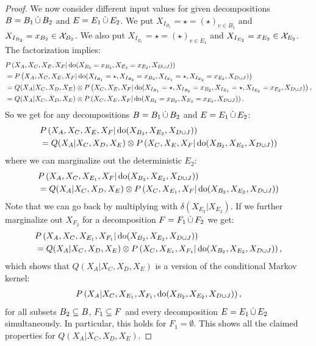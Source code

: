 \begin{proof}
We now consider different input values for given decompositions $B=B_1 \,\dot{\cup}\, B_2$ and $E=E_1 \,\dot{\cup}\, E_2$.
We put $X_{I_{B_1}}= \star = (\star)_{v \in B_1}$ and  $ X_{I_{B_2}}=x_{B_2} \in \mathcal{X}_{B_2}$.
We also put $X_{I_{E_1}}= \star = (\star)_{v \in E_1}$ and $X_{I_{E_2}}=x_{E_2} \in \mathcal{X}_{E_2}$.
The factorization  implies:
\begin{align*} 
  & P\left ( X_A,X_C,X_E,X_F|\operatorname{do}(X_{{B_2}}=x_{B_2},X_{E_2}=x_{E_2},X_{D\cup J})\right ) \\
  &= P\left ( X_A,X_C,X_E,X_F|\operatorname{do}(X_{I_{B_1}}=\star,X_{I_{B_2}}=x_{B_2},X_{I_{E_1}}=\star,X_{I_{E_2}}=x_{E_2},X_{D\cup J})\right ) \\
  &= Q(X_A|X_C,X_D,X_E) \otimes P\left ( X_C,X_E,X_F|\operatorname{do}(X_{I_{B_1}}=\star,X_{I_{B_2}}=x_{B_2},X_{I_{E_1}}=\star,X_{I_{E_2}}=x_{E_2},X_{D\cup J})\right ),\\
  &= Q(X_A|X_C,X_D,X_E) \otimes P\left ( X_C,X_E,X_F|\operatorname{do}(X_{{B_2}}=x_{B_2},X_{{E_2}}=x_{E_2},X_{D\cup J})\right ).
\end{align*}
So we get for any decompositions $B=B_1 \,\dot{\cup}\, B_2$ and $E=E_1 \,\dot{\cup}\, E_2$:
\begin{equation}\begin{split}
  & P\left ( X_A,X_C,X_E,X_F|\operatorname{do}(X_{B_2},X_{E_2},X_{D\cup J})\right ) \\
  &= Q(X_A|X_C,X_D,X_E) \otimes P\left ( X_C,X_E,X_F|\operatorname{do}(X_{B_2},X_{E_2},X_{D\cup J})\right )
\end{split}\end{equation}
where we can marginalize out the deterministic $E_2$:
\begin{equation}\begin{split} \label{eq:all-do-int-2} 
  & P\left ( X_A,X_C,X_{E_1},X_F|\operatorname{do}(X_{B_2},X_{E_2},X_{D\cup J})\right ) \\
  &= Q(X_A|X_C,X_D,X_E) \otimes P\left ( X_C,X_{E_1},X_F|\operatorname{do}(X_{B_2},X_{E_2},X_{D\cup J})\right )
\end{split}\end{equation}
Note that we can go back by multiplying with $\delta(X_{E_2}|X_{E_2})$.
If we further marginalize out $X_{F_2}$ for a decomposition $F=F_1 \,\dot{\cup}\, F_2$ we get:
\begin{equation}\begin{split} \label{eq:all-do-int-3} 
  & P\left ( X_A,X_C,X_{E_1},X_{F_1}|\operatorname{do}(X_{B_2},X_{E_2},X_{D\cup J})\right ) \\
  &= Q(X_A|X_C,X_D,X_E) \otimes P\left ( X_C,X_{E_1},X_{F_1}|\operatorname{do}(X_{B_2},X_{E_2},X_{D\cup J})\right ),
\end{split}\end{equation}
which shows that $Q(X_A|X_C,X_D,X_E)$ is a version of the conditional Markov kernel:
  \begin{align}  \label{eq:all-do-int-4} 
    P\left ( X_A|X_C,X_{E_1},X_{F_1},\operatorname{do}(X_{B_2},X_{E_2},X_{D\cup J})\right ),
  \end{align}
for all subsets $B_2 \subseteq B$, $F_1 \subseteq F$ and every decomposition $E=E_1 \,\dot{\cup}\, E_2$ simultaneously.
In particular, this holds for $F_1 = \emptyset$. This shows all the claimed properties for $Q(X_A|X_C,X_D,X_E)$.


\end{proof}
